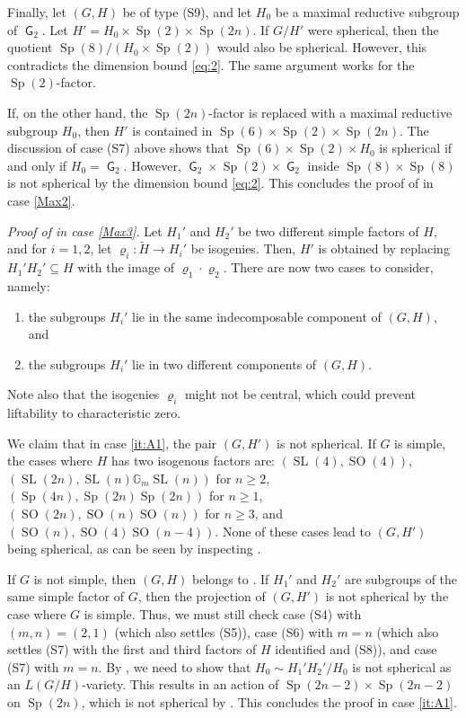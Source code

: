 \documentclass[12pt]{amsart}
\renewcommand{\rho}{\varrho}
\renewcommand{\tilde}{\widetilde}
\newcommand\BBG{{\mathbb G}}
\newcommand\G{{\operatorname{\mathsf G}}}
\newcommand\Gm{{{\BBG}_m}}
\newcommand\SL{\operatorname{SL}}
\newcommand\Sp{\operatorname{Sp}}
\newcommand\SOO{\operatorname{SO}}
\numberwithin{equation}{section}
\theoremstyle{definition}
\begin{document}
Finally, let $(G,H)$ be of type (S9), and let $H_0$ be a maximal
reductive subgroup of $\G_2$. Let
$H' = H_0 \times \Sp(2) \times \Sp(2n)$. If $G/H'$ were spherical,
then the quotient $\Sp(8)/(H_0 \times \Sp(2))$ would also be
spherical. However, this contradicts the dimension bound \eqref{eq:2}.
The same argument works for the $\Sp(2)$-factor.

If, on the other hand, the $\Sp(2n)$-factor is replaced with a maximal
reductive subgroup $H_0$, then $H'$ is contained in
$\Sp(6) \times \Sp(2) \times \Sp(2n)$.  The discussion of case
  (S7) above shows that $\Sp(6) \times \Sp(2) \times H_0$ is
spherical if and only if $H_0 = \G_2$. However,
$\G_2 \times \Sp(2) \times \G_2$ inside $\Sp(8) \times \Sp(8)$ is not
spherical by the dimension bound \eqref{eq:2}.  This concludes the
proof of  in case \ref{Max2}.
	
\emph{Proof of  in case \ref{Max3}.} Let $H_1'$ and $H_2'$ be two
different simple factors of $H$, and for $i = 1,2$, let
$\rho_i:\tilde H\to H_i'$ be isogenies. Then, $H'$ is obtained
by replacing $H_1'H_2'\subseteq H$ with the image of
$\rho_1\cdot\rho_2$. There are now two cases to consider, namely:
\begin{enumerate} [\text{(\roman*)}]
\item\label{it:A1} the subgroups $H_i'$ lie in the same indecomposable component of $(G,H)$,
  and
\item\label{it:A2} the subgroups $H_i'$ lie in two different components of
  $(G,H)$.
\end{enumerate}
Note also that the isogenies $\rho_i$ might not be central, which could
prevent liftability to characteristic zero.

We claim that in case \ref{it:A1}, the pair $(G,H')$ is not spherical. If $G$ is
simple, the cases where $H$ has two isogenous factors are:
$(\SL(4),\SOO(4))$, $(\SL(2n),\SL(n)\Gm\SL(n))$ for $n\geqslant 2$,
$(\Sp(4n),\Sp(2n)\Sp(2n))$ for $n\geqslant 1$, $(\SOO(2n),\SOO(n)\SOO(n))$
for $n\geqslant 3$, and $(\SOO(n), \SOO(4)\SOO(n-4))$.  None of these cases lead to
$(G,H')$ being spherical, as can be seen by inspecting .

If $G$ is not simple, then $(G,H)$ belongs to . If $H_1'$ and
$H_2'$ are subgroups of the same simple factor of $G$, then the
projection of $(G,H')$ is not spherical by the case where $G$ is simple. Thus, we
must still check case (S4) with $(m,n)=(2,1)$ (which also settles (S5)), case (S6)
with $m=n$ (which also settles (S7) with the first and
third factors of $H$ identified and (S8)), and case (S7) with $m=n$. By
, we need to show that $H_0\sim H_1'H_2'/H_0$ is not
spherical as an $L(G/H)$-variety. This results in an action of
$\Sp(2n-2)\times\Sp(2n-2)$ on $\Sp(2n)$, which is not spherical
by . This concludes the proof in case \ref{it:A1}.
\end{document}
